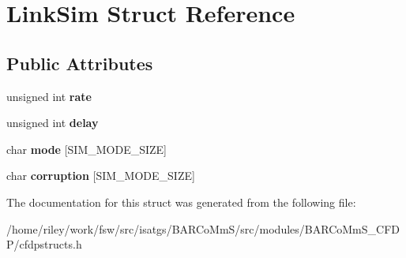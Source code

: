 \hypertarget{struct_link_sim}{}\section{Link\+Sim Struct Reference}
\label{struct_link_sim}
\subsection*{Public Attributes}
\begin{DoxyCompactItemize}
\item 
unsigned int {\bfseries rate}\hypertarget{struct_link_sim_a678cb5d5a27d0b617ee1b840d8067f29}{}\label{struct_link_sim_a678cb5d5a27d0b617ee1b840d8067f29}

\item 
unsigned int {\bfseries delay}\hypertarget{struct_link_sim_aecc4bcb27af1f28fcf537329f7a2663b}{}\label{struct_link_sim_aecc4bcb27af1f28fcf537329f7a2663b}

\item 
char {\bfseries mode} \mbox{[}S\+I\+M\+\_\+\+M\+O\+D\+E\+\_\+\+S\+I\+ZE\mbox{]}\hypertarget{struct_link_sim_acd9073410cb60f1fb9528d5891fcbda6}{}\label{struct_link_sim_acd9073410cb60f1fb9528d5891fcbda6}

\item 
char {\bfseries corruption} \mbox{[}S\+I\+M\+\_\+\+M\+O\+D\+E\+\_\+\+S\+I\+ZE\mbox{]}\hypertarget{struct_link_sim_a30dbd74f177d52b7d8c611ffdec8c0c5}{}\label{struct_link_sim_a30dbd74f177d52b7d8c611ffdec8c0c5}

\end{DoxyCompactItemize}


The documentation for this struct was generated from the following file\+:\begin{DoxyCompactItemize}
\item 
/home/riley/work/fsw/src/isatgs/\+B\+A\+R\+Co\+Mm\+S/src/modules/\+B\+A\+R\+Co\+Mm\+S\+\_\+\+C\+F\+D\+P/cfdpstructs.\+h\end{DoxyCompactItemize}
